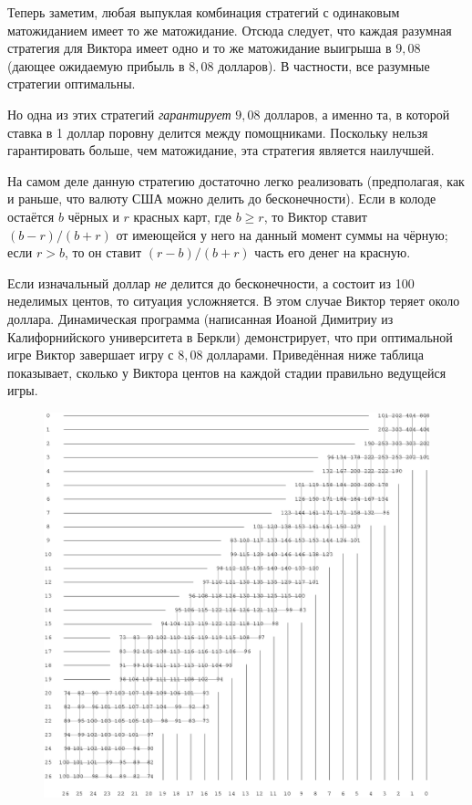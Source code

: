 \documentclass[twoside]{book}
\begin{document}
Теперь заметим, любая выпуклая комбинация стратегий с одинаковым матожиданием имеет то же матожидание.
Отсюда следует, что каждая разумная стратегия для Виктора имеет одно и то же матожидание выигрыша в $9{,}08$ (дающее ожидаемую прибыль в $8{,}08$ долларов).
В частности, все разумные стратегии оптимальны.

Но одна из этих стратегий \emph{гарантирует} $9{,}08$ долларов, а именно та, в которой ставка в 1 доллар поровну делится между помощниками.
Поскольку нельзя гарантировать больше, чем матожидание, эта стратегия является наилучшей.\heart

На самом деле данную стратегию достаточно легко реализовать (предполагая, как и раньше, что валюту США можно делить до бесконечности).
Если в колоде остаётся $b$ чёрных и $r$ красных карт, где $b\ge r$, то Виктор ставит $(b - r)/(b + r)$ от имеющейся у него на данный момент суммы на чёрную; если $r > b$, то он ставит $(r - b)/(b + r)$ часть его денег на красную.


Если изначальный доллар \emph{не} делится до бесконечности, а состоит из 100 неделимых центов, то ситуация усложняется.
В этом случае Виктор теряет около доллара.
Динамическая программа (написанная Иоаной Димитриу %
из Калифорнийского университета в Беркли) демонстрирует, что при оптимальной игре Виктор завершает игру с $8{,}08$ долларами.
Приведённая ниже таблица показывает, сколько у Виктора центов на каждой стадии правильно ведущейся игры.

\begin{figure}[!ht]
\centering
\includegraphics[width=\textwidth]{Figs/Games/ioana} %
\end{figure}
\end{document}
